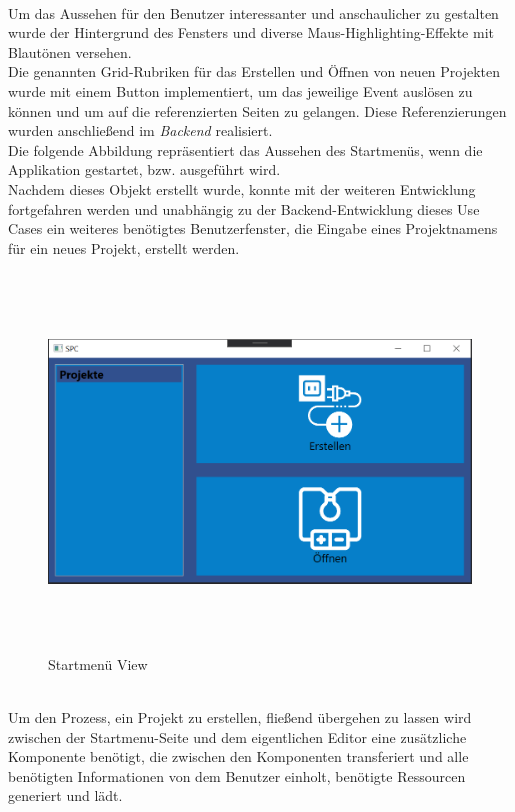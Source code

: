 \\Um das Aussehen für den Benutzer interessanter und anschaulicher zu gestalten wurde der Hintergrund des Fensters und diverse Maus-Highlighting-Effekte
mit Blautönen versehen. 
\\Die genannten Grid-Rubriken für das Erstellen und Öffnen von neuen Projekten wurde mit einem Button implementiert, um das 
jeweilige Event auslösen zu können und um auf die referenzierten Seiten zu gelangen. Diese Referenzierungen wurden anschließend im 
\textit{Backend} realisiert. 
\\Die folgende Abbildung repräsentiert das Aussehen des Startmenüs, wenn die Applikation gestartet, bzw. ausgeführt wird.
\\Nachdem dieses Objekt erstellt wurde, konnte mit der weiteren Entwicklung fortgefahren werden und unabhängig zu der Backend-Entwicklung 
dieses Use Cases ein weiteres benötigtes Benutzerfenster, die Eingabe eines Projektnamens für ein neues Projekt, erstellt werden.
\\
\begin{figure}[hbt!]
    \centering
    \includegraphics[width=15cm,height=10cm,keepaspectratio]{5Implementierungen/Bilder/StartMenuView.png}
    \caption{Startmenü View}
\end{figure}
\\
Um den Prozess, ein Projekt zu erstellen, fließend übergehen zu lassen wird zwischen der Startmenu-Seite und dem eigentlichen Editor eine zusätzliche
Komponente benötigt, die zwischen den Komponenten transferiert und alle benötigten Informationen von dem Benutzer einholt, benötigte Ressourcen generiert und lädt. 
